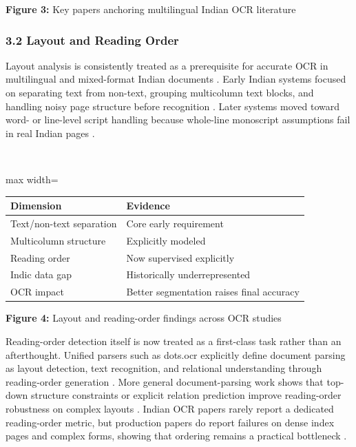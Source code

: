     
    \textbf{Figure 3:} Key papers anchoring multilingual Indian OCR literature
    
    
    \subsubsection*{3.2 Layout and Reading Order}
    
    
    Layout analysis is consistently treated as a prerequisite for accurate OCR in multilingual and mixed-format Indian documents  \cite{Chaudhuri2002Page} \cite{Nath2025IndicDLP:} \cite{Fateh2023Enhancing}. Early Indian systems focused on separating text from non-text, grouping multicolumn text blocks, and handling noisy page structure before recognition  \cite{Chaudhuri2002Page}. Later systems moved toward word- or line-level script handling because whole-line monoscript assumptions fail in real Indian pages  \cite{Pati2004Gabor} \cite{Mathew2016Multilingual} \cite{Kumar2012Discrimination}.
    
    
    \mbox{}\\
    \begin{adjustbox}{max width=\textwidth}
    \begin{tabular}{p{8.0cm} | p{8.0cm}}
    \hline
    Dimension & Evidence \\
    \hline
    Text/non-text separation & Core early requirement  \cite{Chaudhuri2002Page} \cite{Pati2004Gabor} \\
    Multicolumn structure & Explicitly modeled  \cite{Chaudhuri2002Page} \cite{2009} \\
    Reading order & Now supervised explicitly  \cite{Yang2025dots.ocr:} \cite{Li2026Structure-Aware} \\
    Indic data gap & Historically underrepresented  \cite{Nath2025IndicDLP:} \cite{Yang2025dots.ocr:} \\
    OCR impact & Better segmentation raises final accuracy  \cite{Li2025Printed} \cite{Fateh2023Enhancing} \\
    \hline
    \end{tabular}
    \end{adjustbox}
    
    
    \textbf{Figure 4:} Layout and reading-order findings across OCR studies
    
    
    Reading-order detection itself is now treated as a first-class task rather than an afterthought. Unified parsers such as dots.ocr explicitly define document parsing as layout detection, text recognition, and relational understanding through reading-order generation  \cite{Yang2025dots.ocr:}. More general document-parsing work shows that top-down structure constraints or explicit relation prediction improve reading-order robustness on complex layouts  \cite{2009} \cite{Qiao2024Reading} \cite{Li2026Structure-Aware}. Indian OCR papers rarely report a dedicated reading-order metric, but production papers do report failures on dense index pages and complex forms, showing that ordering remains a practical bottleneck  \cite{Kumar2012Discrimination} \cite{Tulsyan2024IndicOCR:}.
    
